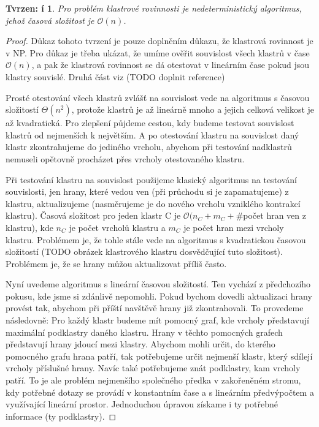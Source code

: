 \documentclass[12pt,a4report]{report}
\newtheorem{tvr}{Tvrzen: í}[chapter]
\begin{document}
\begin{tvr}
Pro problém klastrové rovinnosti je nedeterministický algoritmus, jehož časová složitost je $\mathcal{O}(n)$.
\end{tvr}
\begin{proof}

Důkaz tohoto tvrzení je pouze doplněním důkazu, že klastrová rovinnost je v NP. Pro důkaz je třeba ukázat, že umíme ověřit souvislost všech klastrů v čase $\mathcal{O}(n)$, a pak že klastrová rovinnost se dá otestovat v lineárním čase pokud jsou klastry souvislé.
Druhá část viz (TODO doplnit reference)

Prosté otestování všech klastrů zvlášť na souvislost vede na algoritmus s časovou složitostí $\Theta(n^2)$, protože klastrů je až lineárně mnoho a jejich celková velikost je až kvadratická. Pro zlepšení půjdeme cestou, kdy budeme testovat souvislost klastrů od nejmenších k největším. A po otestování klastru na souvislost daný klastr zkontrahujeme do jediného vrcholu, abychom při testování nadklastrů nemuseli opětovně procházet přes vrcholy otestovaného klastru.

Při testování klastru na souvislost použijeme klasický algoritmus na testování souvislosti, jen hrany, které vedou ven (při průchodu si je zapamatujeme) z klastru, aktualizujeme (nasměrujeme je do nového vrcholu vzniklého kontrakcí klastru). Časová složitost pro jeden klastr C je $\mathcal{O}(n_C + m_C + \#$počet hran ven z klastru), kde $n_C$ je počet vrcholů klastru a $m_C$ je počet hran mezi vrcholy klastru. Problémem je, že tohle stále vede na algoritmus s kvadratickou časovou složitostí (TODO obrázek klastrového klastru dosvědčující tuto složitost). Problémem je, že se hrany můžou aktualizovat příliš často.

Nyní uvedeme algoritmus s lineární časovou složitostí. Ten vychází z předchozího pokusu, kde jsme si zdánlivě nepomohli. Pokud bychom dovedli aktualizaci hrany provést tak, abychom při příští navštěvě hrany již zkontrahovali. To provedeme následovně: Pro každý klastr budeme mít pomocný graf, kde vrcholy představují maximální podklastry daného klastru. Hrany v těchto pomocných grafech představují hrany jdoucí mezi klastry. Abychom mohli určit, do kterého pomocného grafu hrana patří, tak potřebujeme určit nejmenší klastr, který sdílejí vrcholy příslušné hrany. Navíc také potřebujeme znát podklastry, kam vrcholy patří. To je ale problém nejmenšího společného předka v zakořeněném stromu, kdy potřebné dotazy se provádí v konstantním čase a s lineárním předvýpočtem a využívající lineární prostor. Jednoduchou úpravou získame i ty potřebné informace (ty podklastry).


\end{proof}
\end{document}
